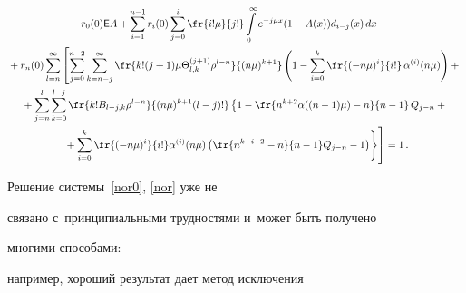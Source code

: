 \begin{multline}

r_0(0) \mathsf{E}A

+ \sum\limits_{i=1}^{n-1} r_i(0) \sum\limits_{j=0}^{i}

\fr{i! \mu }{j!} \int\limits_0^\infty

e^{-j\mu x} (1-A(x)) d_{i-j}(x)\, dx

+{}\\

{}+ r_{n}(0) \sum\limits_{l=n}^{\infty}

\left [ \sum\limits_{j=0}^{n-2} \sum\limits_{k=n-j}^\infty 

\fr{k! (j+1)\mu  \Theta^{(j+1)}_{l,k} \rho^{l-n} }{(n \mu)^{k+1}}

\left ( 1 - \sum\limits_{i=0}^{k}  \fr{(-n\mu)^{i}}{i!} \,\alpha^{(i)}(n \mu)

 \right )+{}

\right.

\\

{}+

\sum\limits_{j=n}^{l} \sum\limits_{k=0}^{l-j}

\fr{k!  B_{l-j,k} \rho^{l-n} }{(n\mu)^{k+1} (l - j)!}

\left\{

1 - \fr{n^{k+2}\alpha((n-1)\mu)-n}{n-1}\,Q_{j-n}

+{}\right.\\

\left.\left.

{}+

\sum\limits_{i=0}^{k}

 \fr{(-n\mu)^{i} }{i!} \alpha^{(i)}(n \mu)

 \left (  \fr{n^{k-i+2} -n}{n-1 } Q_{j-n} -1 \right )


 \right \}\!

\vphantom{\sum\limits_{j=n}^{l}}

\right ]

 =1\,.

 \label{nor}

\end{multline}

Решение системы~\eqref{nor0}, \eqref{nor} уже не

связано с~принципиальными трудностями и~может быть получено

многими способами:

например, хороший результат дает метод исключения

